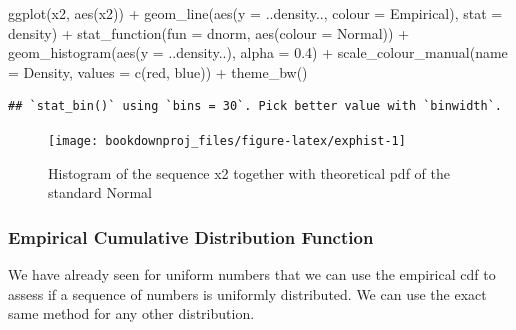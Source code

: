 \documentclass[
]{book}
\newenvironment{Shaded}{\begin{snugshade}}{\end{snugshade}}
\newcommand{\AttributeTok}[1]{\textcolor[rgb]{0.77,0.63,0.00}{#1}}
\newcommand{\FloatTok}[1]{\textcolor[rgb]{0.00,0.00,0.81}{#1}}
\newcommand{\FunctionTok}[1]{\textcolor[rgb]{0.00,0.00,0.00}{#1}}
\newcommand{\NormalTok}[1]{#1}
\newcommand{\SpecialCharTok}[1]{\textcolor[rgb]{0.00,0.00,0.00}{#1}}
\newcommand{\StringTok}[1]{\textcolor[rgb]{0.31,0.60,0.02}{#1}}
\theoremstyle{definition}
\theoremstyle{definition}
\theoremstyle{definition}
\theoremstyle{definition}
\theoremstyle{remark}
\begin{document}
\begin{Shaded}
\begin{Highlighting}[]
\FunctionTok{ggplot}\NormalTok{(x2, }\FunctionTok{aes}\NormalTok{(x2)) }\SpecialCharTok{+}
   \FunctionTok{geom\_line}\NormalTok{(}\FunctionTok{aes}\NormalTok{(}\AttributeTok{y =}\NormalTok{ ..density.., }\AttributeTok{colour =} \StringTok{\textquotesingle{}Empirical\textquotesingle{}}\NormalTok{), }\AttributeTok{stat =} \StringTok{\textquotesingle{}density\textquotesingle{}}\NormalTok{) }\SpecialCharTok{+}
   \FunctionTok{stat\_function}\NormalTok{(}\AttributeTok{fun =}\NormalTok{ dnorm, }\FunctionTok{aes}\NormalTok{(}\AttributeTok{colour =} \StringTok{\textquotesingle{}Normal\textquotesingle{}}\NormalTok{)) }\SpecialCharTok{+}      
   \FunctionTok{geom\_histogram}\NormalTok{(}\FunctionTok{aes}\NormalTok{(}\AttributeTok{y =}\NormalTok{ ..density..), }\AttributeTok{alpha =} \FloatTok{0.4}\NormalTok{) }\SpecialCharTok{+}      
   \FunctionTok{scale\_colour\_manual}\NormalTok{(}\AttributeTok{name =} \StringTok{\textquotesingle{}Density\textquotesingle{}}\NormalTok{, }\AttributeTok{values =} \FunctionTok{c}\NormalTok{(}\StringTok{\textquotesingle{}red\textquotesingle{}}\NormalTok{, }\StringTok{\textquotesingle{}blue\textquotesingle{}}\NormalTok{)) }\SpecialCharTok{+}
   \FunctionTok{theme\_bw}\NormalTok{()}
\end{Highlighting}
\end{Shaded}

\begin{verbatim}
## `stat_bin()` using `bins = 30`. Pick better value with `binwidth`.
\end{verbatim}

\begin{figure}

{\centering \texttt{[image: bookdownproj\_files/figure-latex/exphist-1]} 

}

\caption{Histogram of the sequence x2 together with theoretical pdf of the standard Normal}\label{fig:exphist}
\end{figure}

\hypertarget{empirical-cumulative-distribution-function}{%
\subsubsection{Empirical Cumulative Distribution Function}\label{empirical-cumulative-distribution-function}}

We have already seen for uniform numbers that we can use the empirical cdf to assess if a sequence of numbers is uniformly distributed. We can use the exact same method for any other distribution.
\end{document}
